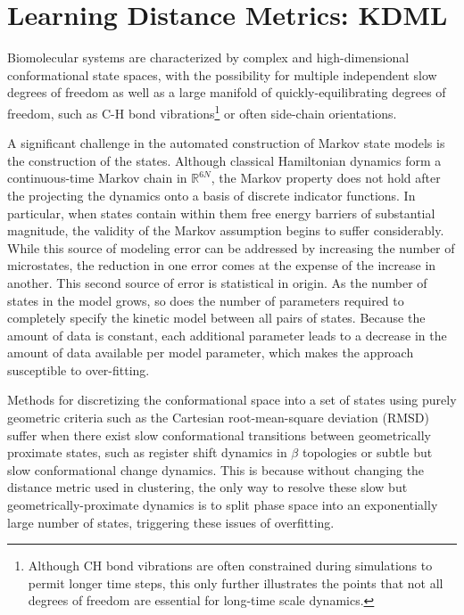 \documentclass[twocolumn,floatfix,nofootinbib,aps]{revtex4-1}
\begin{document}
\section{Learning Distance Metrics: KDML}

Biomolecular systems are characterized by complex and high-dimensional conformational state spaces, with the possibility for multiple independent slow degrees of freedom as well as a large manifold of quickly-equilibrating degrees of freedom, such as C-H bond vibrations\footnote{Although CH bond vibrations are often constrained during simulations to permit longer time steps, this only further illustrates the points that not all degrees of freedom are essential for long-time scale dynamics.} or often side-chain orientations.

A significant challenge in the automated construction of Markov state models is the construction of the states. Although classical Hamiltonian dynamics form a continuous-time Markov chain in $\mathbb{R}^{6N}$\cite{vanKampen:2007ug}, the Markov property does not hold after the projecting the dynamics onto a basis of discrete indicator functions. In particular, when states contain within them free energy barriers of substantial magnitude, the validity of the Markov assumption begins to suffer considerably. While this source of modeling error can be addressed by increasing the number of microstates, the reduction in one error comes at the expense of the increase in another. This second source of error is statistical in origin. As the number of states in the model grows, so does the number of parameters required to completely specify the kinetic model between all pairs of states. Because the amount of data is constant, each additional parameter leads to a decrease in the amount of data available per model parameter, which makes the approach susceptible to over-fitting.

Methods for discretizing the conformational space into a set of states using purely geometric criteria such as the Cartesian root-mean-square deviation (RMSD) suffer when there exist slow conformational transitions between geometrically proximate states, such as register shift dynamics in $\beta$ topologies\cite{Beauchamp:2012kp} or subtle but slow conformational change dynamics. This is because without changing the distance metric used in clustering, the only way to resolve these slow but geometrically-proximate dynamics is to split phase space into an exponentially large number of states, triggering these issues of overfitting.
\end{document}
